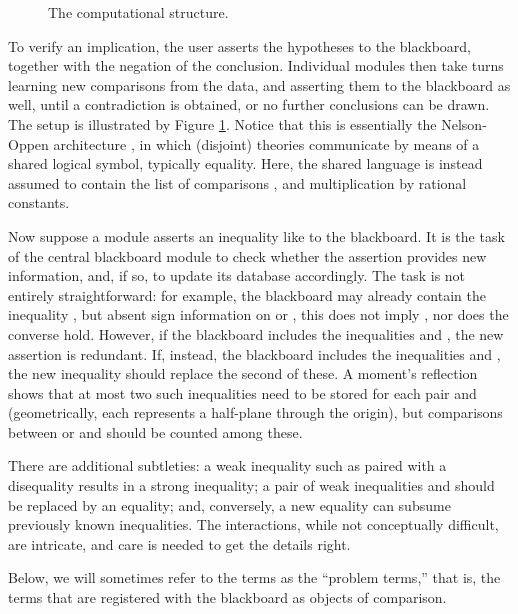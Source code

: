 \documentclass[runningheds]{llncs}
\begin{document}
\begin{figure}[h]
{}\caption{The computational structure.}
\label{fig:bbarch}
\end{figure}



To verify an implication, the user asserts the hypotheses to the blackboard, together with the negation of the conclusion. Individual modules then take turns learning new comparisons from the data, and asserting them to the blackboard as well, until a contradiction is obtained, or no further conclusions can be drawn. The setup is illustrated by Figure \ref{fig:bbarch}. Notice that this is essentially the Nelson-Oppen architecture \cite{barrett:et:al:08} \cite{nelson:oppen:79}, in which (disjoint) theories communicate by means of a shared logical symbol, typically equality. Here, the shared language is instead assumed to contain the list of comparisons , and multiplication by rational constants.

Now suppose a module asserts an inequality like  to the blackboard. It is the task of the central blackboard module to check whether the assertion provides new information, and, if so, to update its database accordingly. The task is not entirely straightforward: for example, the blackboard may already contain the inequality , but absent sign information on  or , this does not imply , nor does the converse hold. However, if the blackboard includes the inequalities  and , the new assertion is redundant. If, instead, the blackboard includes the inequalities  and , the new inequality should replace the second of these. A moment's reflection shows that at most two such inequalities need to be stored for each pair  and  (geometrically, each represents a half-plane through the origin), but comparisons between  or  and  should be counted among these.

There are additional subtleties: a weak inequality such as  paired with a disequality  results in a strong inequality; a pair of weak inequalities  and  should be replaced by an equality; and, conversely, a new equality can subsume previously known inequalities. The interactions, while not conceptually difficult, are intricate, and care is needed to get the details right.

Below, we will sometimes refer to the terms  as the ``problem terms,'' that is, the terms that are registered with the blackboard as objects of comparison.
\end{document}
